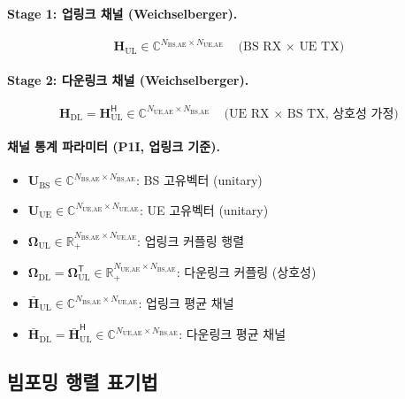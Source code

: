 \documentclass[10pt]{article}
\begin{document}
\paragraph{Stage 1: 업링크 채널 (Weichselberger).}
\begin{equation}
\mathbf{H}_{\text{UL}} \in \mathbb{C}^{N_{\text{BS,AE}} \times N_{\text{UE,AE}}} \quad \text{(BS RX $\times$ UE TX)}
\end{equation}

\paragraph{Stage 2: 다운링크 채널 (Weichselberger).}
\begin{equation}
\mathbf{H}_{\text{DL}} = \mathbf{H}_{\text{UL}}^{\mathsf{H}} \in \mathbb{C}^{N_{\text{UE,AE}} \times N_{\text{BS,AE}}} \quad \text{(UE RX $\times$ BS TX, 상호성 가정)}
\end{equation}

\paragraph{채널 통계 파라미터 (P1I, 업링크 기준).}
\begin{itemize}
    \item $\mathbf{U}_{\text{BS}} \in \mathbb{C}^{N_{\text{BS,AE}} \times N_{\text{BS,AE}}}$: BS 고유벡터 (unitary)
    \item $\mathbf{U}_{\text{UE}} \in \mathbb{C}^{N_{\text{UE,AE}} \times N_{\text{UE,AE}}}$: UE 고유벡터 (unitary)
    \item $\boldsymbol{\Omega}_{\text{UL}} \in \mathbb{R}_+^{N_{\text{BS,AE}} \times N_{\text{UE,AE}}}$: 업링크 커플링 행렬
    \item $\boldsymbol{\Omega}_{\text{DL}} = \boldsymbol{\Omega}_{\text{UL}}^{\mathsf{T}} \in \mathbb{R}_+^{N_{\text{UE,AE}} \times N_{\text{BS,AE}}}$: 다운링크 커플링 (상호성)
    \item $\bar{\mathbf{H}}_{\text{UL}} \in \mathbb{C}^{N_{\text{BS,AE}} \times N_{\text{UE,AE}}}$: 업링크 평균 채널
    \item $\bar{\mathbf{H}}_{\text{DL}} = \bar{\mathbf{H}}_{\text{UL}}^{\mathsf{H}} \in \mathbb{C}^{N_{\text{UE,AE}} \times N_{\text{BS,AE}}}$: 다운링크 평균 채널
\end{itemize}

\subsection{빔포밍 행렬 표기법}
\end{document}
